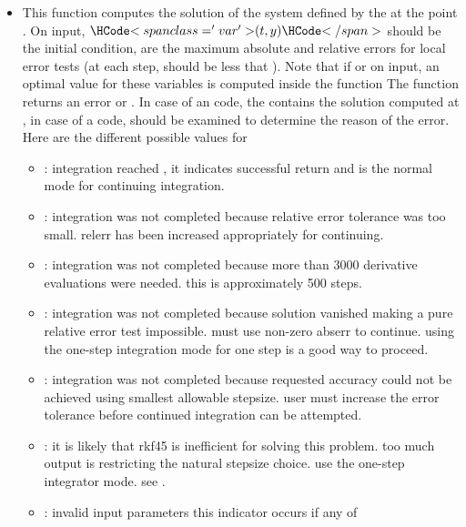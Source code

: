 \begin{itemize}
\item {}
  \sshortdescribe This function computes the solution of the system defined by
  the   at the point . On input,
  $\var{(t,y)}$ should be the initial condition,  are the
  maximum absolute and relative errors for local error tests (at each step,
     should be less that ).
  Note that if  or   on input, an optimal value
  for these variables is computed inside the function The function returns an
  error  or . In case of an  code, the 
  contains the solution computed at , in case of a  code,
   should be examined to determine the reason of the error. Here are
  the different possible values for 
  \begin{itemize}
  \item {} : integration reached , it indicates
    successful return and is the normal mode for continuing integration.
 \item {} : integration was not completed because relative error
   tolerance was too small. relerr has been increased appropriately for
   continuing.
 \item {} : integration was not completed because more than 3000
   derivative evaluations were needed. this is approximately 500 steps.
 \item {} : integration was not completed because solution vanished
   making a pure relative error test impossible. must use non-zero abserr to
   continue.  using the one-step integration mode for one step is a good way to
   proceed.
 \item {} : integration was not completed because requested accuracy
   could not be achieved using smallest allowable stepsize. user must increase
   the error tolerance before continued integration can be attempted.
 \item {} : it is likely that rkf45 is inefficient for solving this
   problem. too much output is restricting the natural stepsize choice. use the
   one-step integrator mode. see .
 \item {} : invalid input parameters this indicator occurs if any of

\end{itemize}
\end{itemize}
